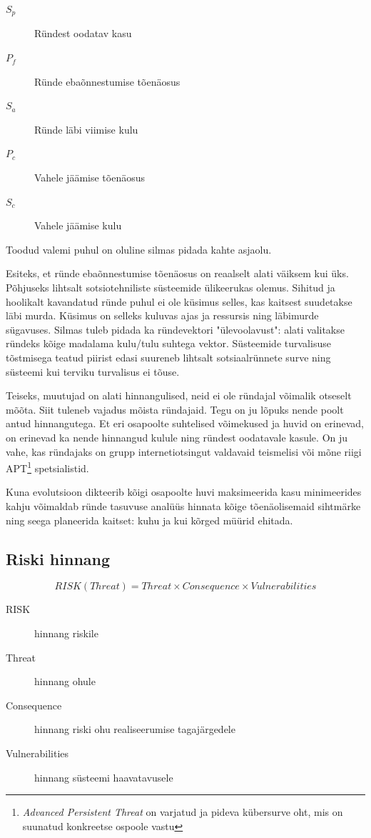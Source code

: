 	\begin{description}
		\item[$S_p$] Ründest oodatav kasu
		\item[$P_f$] Ründe ebaõnnestumise tõenäosus
		\item[$S_a$] Ründe läbi viimise kulu
		\item[$P_c$] Vahele jäämise tõenäosus
		\item[$S_c$] Vahele jäämise kulu
	\end{description}

Toodud valemi puhul on oluline silmas pidada kahte asjaolu. 

Esiteks, et ründe ebaõnnestumise tõenäosus on reaalselt alati väiksem kui üks. Põhjuseks lihtsalt sotsiotehniliste süsteemide ülikeerukas olemus. Sihitud ja hoolikalt kavandatud ründe puhul ei ole küsimus selles, kas kaitsest suudetakse läbi murda. Küsimus on selleks kuluvas ajas ja ressursis ning läbimurde sügavuses. Silmas tuleb pidada ka ründevektori "ülevoolavust": alati valitakse ründeks kõige madalama kulu/tulu suhtega vektor. Süsteemide turvalisuse tõstmisega teatud piirist edasi suureneb lihtsalt sotsiaalrünnete surve ning süsteemi kui terviku turvalisus ei tõuse. 

Teiseks, muutujad on alati hinnangulised, neid ei ole ründajal võimalik otseselt mõõta. Siit tuleneb vajadus mõista ründajaid. Tegu on ju lõpuks nende poolt antud hinnangutega. Et eri osapoolte suhtelised võimekused ja huvid on erinevad, on erinevad ka nende hinnangud kulule ning ründest oodatavale kasule. On ju vahe, kas ründajaks on grupp internetiotsingut valdavaid teismelisi või mõne riigi APT\footnote{\emph{Advanced Persistent Threat} on varjatud ja pideva kübersurve oht, mis on suunatud konkreetse ospoole vastu} spetsialistid. 

Kuna evolutsioon dikteerib kõigi osapoolte huvi maksimeerida kasu minimeerides kahju võimaldab ründe tasuvuse analüüs hinnata kõige tõenäolisemaid sihtmärke ning seega planeerida kaitset: kuhu ja kui kõrged müürid ehitada. 

\subsection{Riski hinnang}

\begin{equation}
	RISK(Threat) = Threat \times Consequence \times Vulnerabilities
	\label{eq:risk}
\end{equation}

\begin{description}
	\item[RISK] hinnang riskile
	\item[Threat] hinnang ohule
	\item[Consequence] hinnang riski ohu realiseerumise tagajärgedele
	\item[Vulnerabilities] hinnang süsteemi haavatavusele
\end{description}

